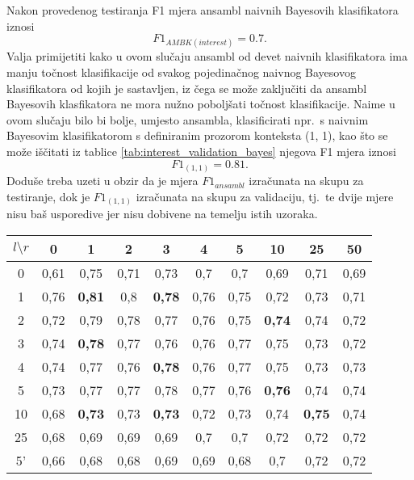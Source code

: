 \documentclass[10pt, a4paper]{article}
\begin{document}
Nakon provedenog testiranja F1 mjera ansambl naivnih Bayesovih klasifikatora
iznosi
\begin{equation}
\label{eq:F1_ansambl}
F1_{AMBK(interest)} = 0.7.
\end{equation}
Valja primijetiti kako u ovom
slučaju ansambl od devet naivnih klasifikatora ima manju točnost klasifikacije
od svakog pojedinačnog naivnog Bayesovog klasifikatora od kojih je sastavljen,
iz čega se može zaključiti da ansambl Bayesovih klasfikatora ne mora nužno poboljšati
točnost klasifikacije. Naime u ovom slučaju bilo bi bolje, umjesto ansambla, klasificirati
npr.~s naivnim Bayesovim klasifikatorom s definiranim prozorom konteksta (1, 1), kao
što se može iščitati iz tablice \ref{tab:interest_validation_bayes} njegova F1 mjera iznosi
\begin{equation}
\label{eq:F1_1_1}
F1_{(1,1)} = 0.81.
\end{equation}
Doduše treba uzeti u obzir da je mjera $F1_{ansambl}$ izračunata na skupu za testiranje,
dok je $F1_{(1,1)}$ izračunata na skupu za validaciju, tj.~te dvije mjere nisu
baš usporedive jer nisu dobivene na temelju istih uzoraka.

\begin{table*}[!hbtp]
\caption{F1 mjere Bayesovih klasifikatora dobivene validacijom za riječ \emph{interest}}
\label{tab:interest_validation_bayes}
\begin{center}
\begin{tabular}{|c|ccccccccc|}
\hline
$l \setminus r$ & 0 & 1 & 2 & 3 & 4 & 5 & 10 & 25 & 50 \\
\hline
0  & 0,61 & 0,75 & 0,71 & 0,73 & 0,7  & 0,7  & 0,69 & 0,71 & 0,69  \\
1  & 0,76 & \textbf{0,81} & 0,8  & \textbf{0,78} & 0,76 & 0,75 & 0,72 & 0,73 & 0,71  \\
2  & 0,72 & 0,79 & 0,78 & 0,77 & 0,76 & 0,75 & \textbf{0,74} & 0,74 & 0,72  \\
3  & 0,74 & \textbf{0,78} & 0,77 & 0,76 & 0,76 & 0,77 & 0,75 & 0,73 & 0,72  \\
4  & 0,74 & 0,77 & 0,76 & \textbf{0,78} & 0,76 & 0,77 & 0,75 & 0,73 & 0,73  \\
5  & 0,73 & 0,77 & 0,77 & 0,78 & 0,77 & 0,76 & \textbf{0,76} & 0,74 & 0,74  \\
10 & 0,68 & \textbf{0,73} & 0,73 & \textbf{0,73} & 0,72 & 0,73 & 0,74 & \textbf{0,75} & 0,74  \\
25 & 0,68 & 0,69 & 0,69 & 0,69 & 0,7  & 0,7  & 0,72 & 0,72 & 0,72  \\
5' & 0,66 & 0,68 & 0,68 & 0,69 & 0,69 & 0,68 & 0,7  & 0,72 & 0,72  \\
\hline
\end{tabular}
\end{center}
\end{table*}
\end{document}
